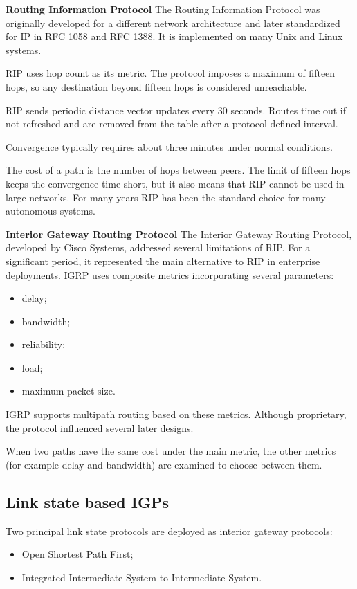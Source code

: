 \textbf{Routing Information Protocol} The Routing Information Protocol was originally developed for a different network architecture and later standardized for IP in RFC 1058 and RFC 1388. It is implemented on many Unix and Linux systems.

RIP uses hop count as its metric. The protocol imposes a maximum of fifteen hops, so any destination beyond fifteen hops is considered unreachable.

RIP sends periodic distance vector updates every 30 seconds. Routes time out if not refreshed and are removed from the table after a protocol defined interval.

Convergence typically requires about three minutes under normal conditions.

The cost of a path is the number of hops between peers. The limit of fifteen hops
keeps the convergence time short, but it also means that RIP cannot be used in
large networks. For many years RIP has been the standard choice for many
autonomous systems.

\textbf{Interior Gateway Routing Protocol} The Interior Gateway Routing Protocol, developed by Cisco Systems, addressed several limitations of RIP. For a significant period, it represented the main alternative to RIP in enterprise deployments. IGRP uses composite metrics incorporating several parameters:

\begin{itemize}
\item delay;
\item bandwidth;
\item reliability;
\item load;
\item maximum packet size.
\end{itemize}

IGRP supports multipath routing based on these metrics. Although proprietary, the protocol influenced several later designs.

When two paths have the same cost under the main metric, the other metrics
(for example delay and bandwidth) are examined to choose between them.

\subsection{Link state based IGPs}

Two principal link state protocols are deployed as interior gateway protocols:

\begin{itemize}
\item Open Shortest Path First;
\item Integrated Intermediate System to Intermediate System.
\end{itemize}

